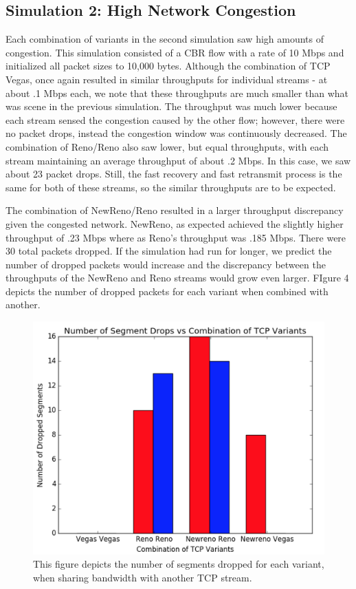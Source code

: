 \subsection{Simulation 2: High Network Congestion}

Each combination of variants in the second simulation saw high amounts of congestion. This simulation consisted of a CBR flow with a rate of 10 Mbps and initialized all packet sizes to 10,000 bytes. Although the combination of TCP Vegas, once again resulted in similar throughputs for individual streams - at about .1 Mbps each, we note that these throughputs are much smaller than what was scene in the previous simulation. The throughput was much lower because each stream sensed the congestion caused by the other flow; however, there were no packet drops, instead the congestion window was continuously decreased. The combination of Reno/Reno also saw lower, but equal throughputs, with each stream maintaining an average throughput of about .2 Mbps. In this case, we saw about 23 packet drops. Still, the fast recovery and fast retransmit process is the same for both of these streams, so the similar throughputs are to be expected.

The combination of NewReno/Reno resulted in a larger throughput discrepancy given the congested network. NewReno, as expected achieved the slightly higher throughput of .23 Mbps where as Reno's throughput was .185 Mbps. There were 30 total packets dropped. If the simulation had run for longer, we predict the number of dropped packets would increase and the discrepancy between the throughputs of the NewReno and Reno streams would grow even larger. FIgure 4 depicts the number of dropped packets for each variant when combined with another.

\begin{figure}[!htbp]
	\includegraphics[scale=0.3]{exp2_dp.png}
	\caption{This figure depicts the number of segments dropped for each variant, when sharing bandwidth with another TCP stream.}
	\label{a:label}
\end{figure}


